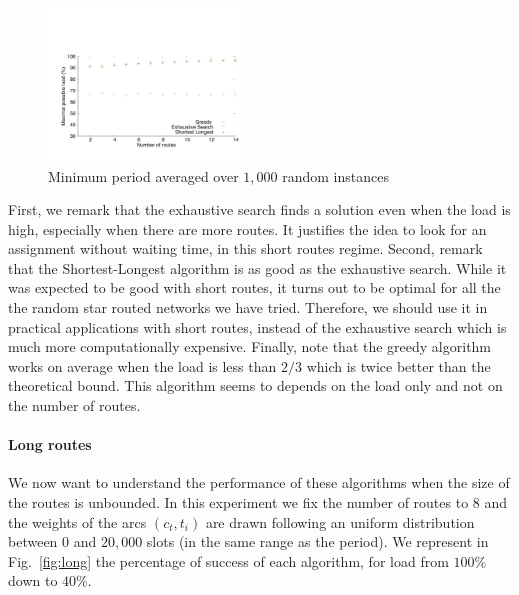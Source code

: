 \documentclass[10pt, conference, letterpaper]{IEEEtran}
\begin{document}
        
      \begin{figure}[h]
      \begin{center}
	 \includegraphics[width=0.47\textwidth]{periode_petite.pdf}
      \end{center}
      \caption{Minimum period averaged over $1,000$ random instances}\label{fig:short}
      \end{figure}
      First, we remark that the exhaustive search finds a solution even when the load is high, especially when there are more routes.
      It justifies the idea to look for an assignment without waiting time, in this short routes regime.
      Second, remark that the Shortest-Longest algorithm is as good as the exhaustive search. While it was expected to be good with short routes, it turns out to be optimal for all the the random star routed networks we have tried. Therefore, we should use it in practical applications with short routes, instead of the exhaustive search which is much more computationally expensive. 
      Finally, note that the greedy algorithm works on average when the load is less than $2/3$ which is twice better than the theoretical bound. This algorithm seems to depends on the load only and not on the number of routes.
      
        \paragraph{Long routes}
      
      We now want to understand the performance of these algorithms when the size of the routes is unbounded. In this experiment we fix the number of routes to $8$ and the weights of the arcs $(c_t,t_i)$ are drawn following an uniform distribution between $0$ and $20,000$ slots (in the same range as the period). We represent in Fig.~\ref{fig:long} the percentage of success of each algorithm, for load from $100\%$ down to $40\%$.
      
\end{document}
